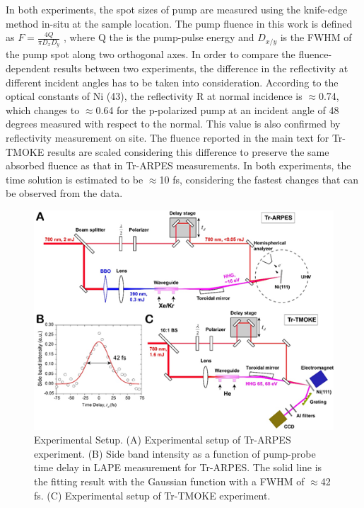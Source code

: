 In both experiments, the spot sizes of pump are measured using the knife-edge method in-situ at the sample location. The pump fluence in this work is defined as $F=\frac{4Q}{\pi D_x D_y}$ , where Q the is the pump-pulse energy and $D_{x/y}$ is the FWHM of the pump spot along two orthogonal axes. In order to compare the fluence-dependent results between two experiments, the difference in the reflectivity at different incident angles has to be taken into consideration. According to the optical constants of Ni (43), the reflectivity R at normal incidence is $\approx$0.74, which changes to $\approx$0.64 for the p-polarized pump at an incident angle of 48 degrees measured with respect to the normal. This value is also confirmed by reflectivity measurement on site. The fluence reported in the main text for Tr-TMOKE results are scaled considering this difference to preserve the same absorbed fluence as that in Tr-ARPES measurements. In both experiments, the time solution is estimated to be $\approx$10 fs, considering the fastest changes that can be observed from the data.

\begin{figure}[htbp]
	\begin{center}
		\includegraphics[width=150mm]{figs/NiFigS1}
	\end{center}
	\caption{Experimental Setup. (A) Experimental setup of Tr-ARPES experiment. (B) Side band intensity as a function of pump-probe time delay in LAPE measurement for Tr-ARPES. The solid line is the fitting result with the Gaussian function with a FWHM of $\approx$42 fs. (C) Experimental setup of Tr-TMOKE experiment.}
	\label{fig: NiSIfig1}
\end{figure}

